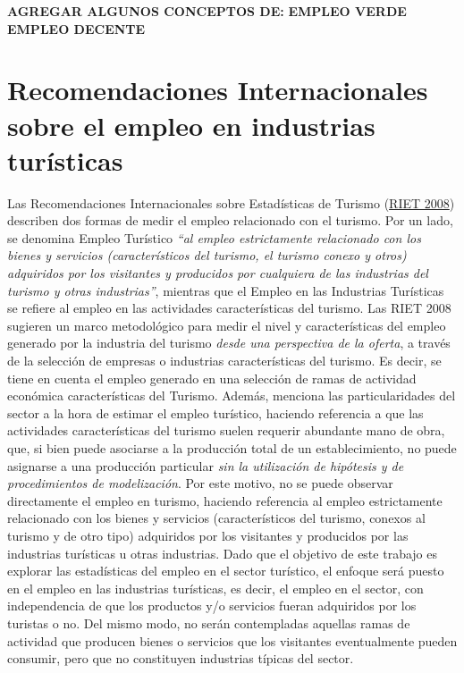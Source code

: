 \documentclass[
  openany]{book}
\begin{document}
\textbf{AGREGAR ALGUNOS CONCEPTOS DE:}
\textbf{EMPLEO VERDE }
\textbf{EMPLEO DECENTE}

\hypertarget{recomendaciones-internacionales-sobre-el-empleo-en-industrias-turuxedsticas}{%
\section{Recomendaciones Internacionales sobre el empleo en industrias turísticas}\label{recomendaciones-internacionales-sobre-el-empleo-en-industrias-turuxedsticas}}

Las Recomendaciones Internacionales sobre Estadísticas de Turismo (\href{https://unstats.un.org/unsd/publication/seriesm/seriesm_83rev1s.pdf}{RIET 2008}) describen dos formas de medir el empleo relacionado con el turismo. Por un lado, se denomina Empleo Turístico \emph{``al empleo estrictamente relacionado con los bienes y servicios (característicos del turismo, el turismo conexo y otros) adquiridos por los visitantes y producidos por cualquiera de las industrias del turismo y otras industrias''}, mientras que el Empleo en las Industrias Turísticas se refiere al empleo en las actividades características del turismo.
Las RIET 2008 sugieren un marco metodológico para medir el nivel y características del empleo generado por la industria del turismo \emph{desde una perspectiva de la oferta}, a través de la selección de empresas o industrias características del turismo. Es decir, se tiene en cuenta el empleo generado en una selección de ramas de actividad económica características del Turismo.
Además, menciona las particularidades del sector a la hora de estimar el empleo turístico, haciendo referencia a que las actividades características del turismo suelen requerir abundante mano de obra, que, si bien puede asociarse a la producción total de un establecimiento, no puede asignarse a una producción particular \emph{sin la utilización de hipótesis y de procedimientos de modelización}.
Por este motivo, no se puede observar directamente el empleo en turismo, haciendo referencia al empleo estrictamente relacionado con los bienes y servicios (característicos del turismo, conexos al turismo y de otro tipo) adquiridos por los visitantes y producidos por las industrias turísticas u otras industrias.
Dado que el objetivo de este trabajo es explorar las estadísticas del empleo en el sector turístico, el enfoque será puesto en el empleo en las industrias turísticas, es decir, el empleo en el sector, con independencia de que los productos y/o servicios fueran adquiridos por los turistas o no. Del mismo modo, no serán contempladas aquellas ramas de actividad que producen bienes o servicios que los visitantes eventualmente pueden consumir, pero que no constituyen industrias típicas del sector.
\end{document}
